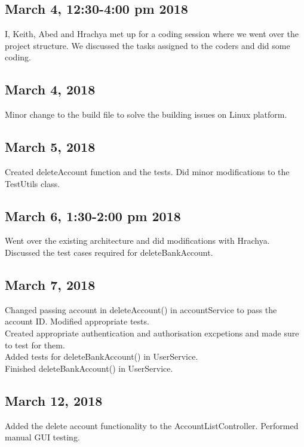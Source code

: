 \documentclass[12pt]{article}
\begin{document}
\maketitle

\subsection*{March 4, 12:30-4:00 pm 2018}
I, Keith, Abed and Hrachya met up for a coding session where we went over the project structure. We discussed the tasks assigned to the coders and did some coding.

\subsection*{March 4, 2018}
Minor change to the build file to solve the building issues on Linux platform.

\subsection*{March 5, 2018}
Created deleteAccount function and the tests. Did minor modifications to the TestUtils class.

\subsection*{March 6, 1:30-2:00 pm 2018}
Went over the existing architecture and did modifications with Hrachya. Discussed the test cases required for deleteBankAccount.

\subsection*{March 7,  2018}
Changed passing account in deleteAccount() in accountService to pass the account ID. Modified appropriate tests. \\
Created appropriate authentication and authorisation excpetions and made sure to test for them. \\
Added tests for deleteBankAccount() in UserService. \\
Finished deleteBankAccount() in UserService. 

\subsection*{March 12,  2018}
 Added the delete account functionality to the AccountListController. Performed manual GUI testing.
 
\end{document}
